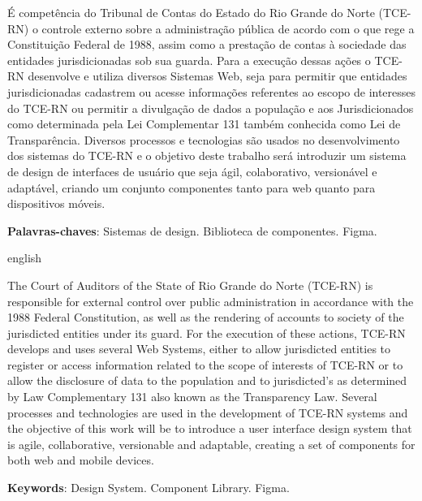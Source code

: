 \setlength{\absparsep}{18pt} %
\begin{resumo}

É competência do Tribunal de Contas do Estado do Rio Grande do Norte (TCE-RN) o controle externo sobre a administração pública de acordo com o que rege a Constituição Federal de 1988, assim como a prestação de contas à sociedade das entidades jurisdicionadas sob sua guarda. Para a execução dessas ações o TCE-RN desenvolve e utiliza diversos Sistemas Web, seja para permitir que entidades jurisdicionadas  cadastrem ou acesse informações referentes ao escopo de interesses do TCE-RN ou permitir a divulgação de dados a população e aos Jurisdicionados como determinada pela Lei Complementar 131 também conhecida como Lei de Transparência. Diversos processos e tecnologias são usados no desenvolvimento dos sistemas do TCE-RN e o objetivo deste trabalho será introduzir um sistema de design de interfaces de usuário que seja ágil, colaborativo, versionável e adaptável, criando um conjunto componentes tanto para web quanto para dispositivos móveis.
 
 \noindent
 \textbf{Palavras-chaves}: Sistemas de design. Biblioteca de componentes. Figma. 
\end{resumo}
\begin{resumo}[Abstract]
	\begin{otherlanguage*}{english}
	
	The Court of Auditors of the State of Rio Grande do Norte (TCE-RN) is responsible for external control over public administration in accordance with the 1988 Federal Constitution, as well as the rendering of accounts to society of the jurisdicted entities under its guard. For the execution of these actions, TCE-RN develops and uses several Web Systems, either to allow jurisdicted entities to register or access information related to the scope of interests of TCE-RN or to allow the disclosure of data to the population and to jurisdicted's as determined by Law Complementary 131 also known as the Transparency Law. Several processes and technologies are used in the development of TCE-RN systems and the objective of this work will be to introduce a user interface design system that is agile, collaborative, versionable and adaptable, creating a set of components for both web and mobile devices. 
	
	\vspace{\onelineskip}
	\noindent 
	\textbf{Keywords}: Design System. Component Library. Figma.
	\end{otherlanguage*}
\end{resumo}
